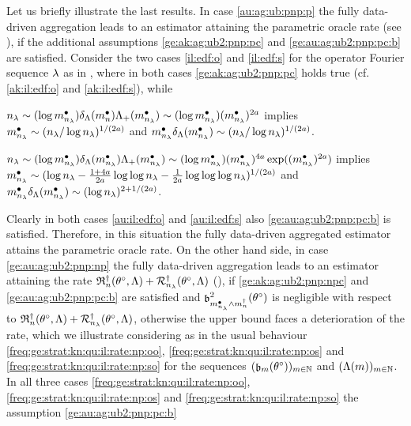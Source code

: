 \begin{il}\label{au:ag:ub:pnp:il}
  Let us briefly illustrate the last results. In case
  \ref{au:ag:ub:pnp:p} the fully data-driven aggregation leads to an
  estimator attaining the parametric oracle rate (see
  ), if the additional assumptions
  \ref{ge:ak:ag:ub2:pnp:pc} and \ref{ge:au:ag:ub2:pnp:pc:b} are satisfied.
  Consider the two cases \ref{il:edf:o} and \ref{il:edf:s} for the
  operator Fourier sequence $\edf$ as in , where in both cases 
 \ref{ge:ak:ag:ub2:pnp:pc} holds true (cf. 
 \ref{ak:il:edf:o} and \ref{ak:il:edf:s}), while
  \begin{Liste}[]
  \item[\mylabel{au:il:edf:o}{\dg\bfseries{(o)}}]
    $\ssE\sim(\log\sDi{\ssE})\cmSv[\sDi{\ssY}]\miSv[\sDi{\ssE}]
    \sim(\log\sDi{\ssE})(\sDi{\ssE})^{2a}$
    implies $\sDi{\ssE}\sim(\ssE/\log\ssE)^{1/(2a)}$ and
    $\sDi{\ssE}\cmSv[\sDi{\ssE}]\sim (\ssE/\log\ssE)^{1/(2a)}$.
  \item[\mylabel{au:il:edf:s}{\dg\bfseries{(s)}}]
    $\ssE\sim(\log\sDi{\ssE})\cmSv[\sDi{\ssE}]\miSv[\sDi{\ssE}]\sim
    (\log\sDi{\ssE})(\sDi{\ssE})^{4a}\exp((\sDi{\ssE})^{2a})$ implies
    $\sDi{\ssE}\sim(\log
    \ssE-\tfrac{1+4a}{2a}\log\log\ssE-\tfrac{1}{2a}\log\log\log\ssE)^{1/(2a)}$
    and $\sDi{\ssE}\cmSv[\sDi{\ssE}]\sim (\log \ssE)^{2+1/(2a)}$.
  \end{Liste}
  Clearly in both cases \ref{au:il:edf:o} and \ref{au:il:edf:s} also
  \ref{ge:au:ag:ub2:pnp:pc:b} is satisfied. Therefore, in this situation
  the fully data-driven aggregated estimator attains the parametric
  oracle rate. On the other hand side, in case \ref{ge:au:ag:ub2:pnp:np}
  the fully data-driven aggregation leads to an estimator attaining
  the rate $\naRa{(\xdf,\Lambda)}+\mRa{\xdf,\Lambda}$ (),
  if \ref{ge:ak:ag:ub2:pnp:npc} and
  \ref{ge:au:ag:ub2:pnp:pc:b} are satisfied and
  $\bias[\sDi{\ssE}\wedge\aDi{\ssY}]^2(\xdf)$ is negligible with
  respect to $\naRa{(\xdf,\Lambda)}+\mRa{\xdf,\Lambda}$, otherwise the upper
  bound faces a deterioration of the rate, which we illustrate
  considering as in  the usual behaviour
  \ref{freq:ge:strat:kn:qu:il:rate:np:oo}, \ref{freq:ge:strat:kn:qu:il:rate:np:os} and
  \ref{freq:ge:strat:kn:qu:il:rate:np:so} for the sequences
  $\Nsuite[\Di]{\bias[\Di](\xdf)}$ and $\Nsuite[\Di]{\iSv[\Di]}$.
  In all three cases \ref{freq:ge:strat:kn:qu:il:rate:np:oo}, \ref{freq:ge:strat:kn:qu:il:rate:np:os} and
  \ref{freq:ge:strat:kn:qu:il:rate:np:so} the assumption \ref{ge:au:ag:ub2:pnp:pc:b}

\end{il}
